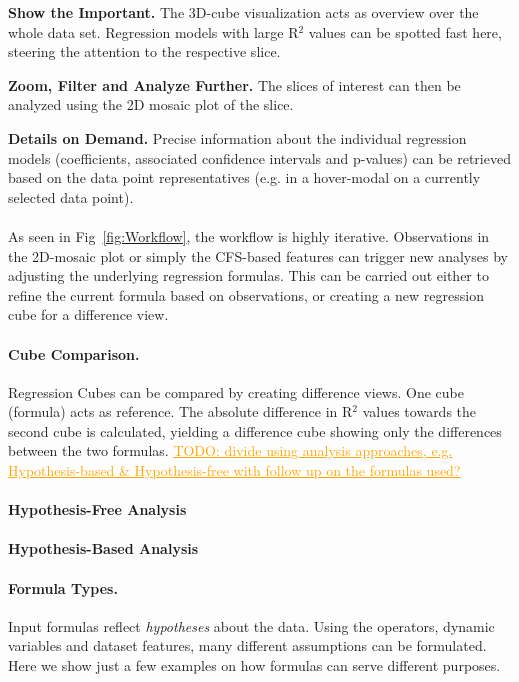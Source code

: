 \documentclass[journal]{style/vgtc} 			          %
\newcommand{\com}[1]{\textcolor{orange}{\uline{#1}}}
\begin{document}
\textbf{Show the Important.} The 3D-cube visualization acts as overview over the whole data set.
Regression models with large R$^2$ values can be spotted fast here, steering the attention to the respective slice.

\textbf{Zoom, Filter and Analyze Further.} The slices of interest can then be analyzed using the 2D mosaic plot of the slice.

\textbf{Details on Demand.} Precise information about the individual regression models (coefficients, associated confidence intervals and p-values) can be retrieved based on the data point representatives (e.g. in a hover-modal on a currently selected data point).
\\\\
As seen in Fig~\ref{fig:Workflow}, the workflow is highly iterative.
Observations in the 2D-mosaic plot or simply the CFS-based features can trigger new analyses by adjusting the underlying regression formulas.
This can be carried out either to refine the current formula based on observations, or creating a new regression cube for a difference view.
\paragraph{Cube Comparison.}
Regression Cubes can be compared by creating difference views.
One cube (formula) acts as reference.
The absolute difference in R$^2$ values towards the second cube is calculated, yielding a difference cube showing only the differences between the two formulas.
\com{TODO: divide using analysis approaches, e.g. Hypothesis-based \& Hypothesis-free with follow up on the formulas used?}
\paragraph{Hypothesis-Free Analysis}
\paragraph{Hypothesis-Based Analysis}
\paragraph{Formula Types.}
Input formulas reflect \emph{hypotheses} about the data.
Using the operators, dynamic variables and dataset features, many different assumptions can be formulated.
Here we show just a few examples on how formulas can serve different purposes.
\end{document}
